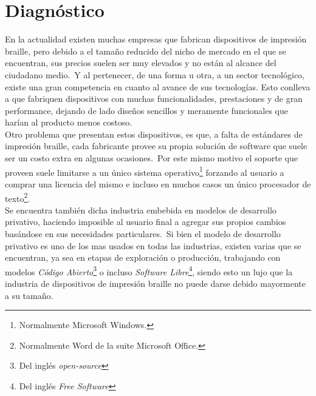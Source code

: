 \chapter{Diagn\'ostico}




En la actualidad existen muchas empresas que fabrican dispositivos de
impresi\'on braille, pero debido a el tama\~no reducido del nicho de mercado
en el que se encuentran, sus precios suelen ser muy elevados y no est\'an al
alcance del ciudadano medio.\ Y al pertenecer, de una forma u otra, a un sector
tecnol\'ogico, existe una gran competencia en cuanto al avance de sus
tecnolog\'ias. Esto conlleva a que fabriquen dispositivos con muchas
funcionalidades, prestaciones y de gran performance, dejando de lado dise\~nos
sencillos y meramente funcionales que har\'ian al producto menos costoso.\\

Otro problema que presentan estos dispositivos, es que, a falta de est\'andares
de impresi\'on braille, cada fabricante provee su propia soluci\'on de
software que suele ser un costo extra en algunas ocasiones.\ 
Por este mismo motivo el soporte que proveen suele limitarse a un \'unico
sistema operativo\footnote{Normalmente Microsoft Windows.} forzando al usuario
a comprar una licencia del mismo e incluso en muchos casos un \'unico
procesador de texto\footnote{Normalmente Word de la suite Microsoft Office.}.\\

Se encuentra tambi\'en dicha industria embebida en modelos de desarrollo
privativo, haciendo imposible al usuario final a agregar sus propios cambios
bas\'andose en sus necesidades particulares.\ Si bien el modelo de desarrollo
privativo es uno de los mas usados en todas las industrias, existen varias que
se encuentran, ya sea en etapas de exploraci\'on o producci\'on, trabajando con
modelos \emph{C\'odigo Abierto}\footnote{Del ingl\'es \emph{open-source}} o
incluso \emph{Software Libre}\footnote{Del ingl\'es \emph{ Free Software}},
siendo esto un lujo que la industria de dispositivos de impresi\'on braille no
puede darse debido mayormente a su tama\~no.\\

